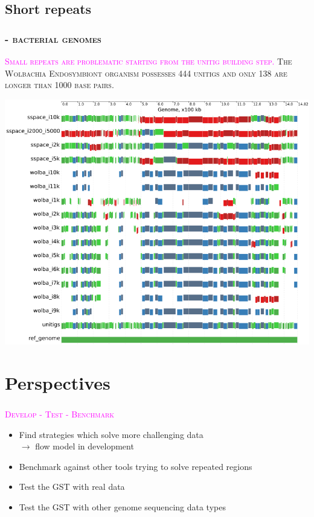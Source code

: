 \documentclass{beamer}
\begin{document}
\subsection{Short repeats}\label{shortrepeats}
\begin{frame}
\frametitle{\textsc{ - bacterial genomes}}
\scriptsize \textsc{\textcolor{magenta}{Small repeats are problematic starting from the unitig building step.} The Wolbachia Endosymbiont organism possesses 444 unitigs and only 138 are longer than 1000 base pairs.} \\
\vspace*{0.2cm}
\begin{center}
\includegraphics[scale=0.3]{alignment_woinserts.png}
\end{center}

\end{frame}

\section{Perspectives}\label{17}
\begin{frame}
\frametitle{\textsc{}}
\begin{center}
\textsc{\textcolor{magenta}{Develop - Test - Benchmark}}
\end{center}
\begin{itemize}
\item Find strategies which solve more challenging data \\ $\to$ flow model in development
\item Benchmark against other tools trying to solve repeated regions
\item Test the GST with real data
\item Test the GST with other genome sequencing data types
\end{itemize}
\end{frame}
\end{document}
